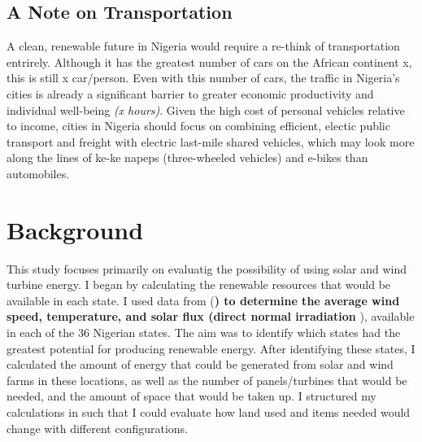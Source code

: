 \documentclass{scrartcl}
\begin{document}
\hypertarget{a-note-on-transportation}{%
\subsection{A Note on Transportation}\label{a-note-on-transportation}}

A clean, renewable future in Nigeria would require a re-think of
transportation entrirely. Although it has the greatest number of cars on
the African continent x, this is still x car/person. Even with this
number of cars, the traffic in Nigeria's cities is already a significant
barrier to greater economic productivity and individual well-being
\emph{(x hours)}. Given the high cost of personal vehicles relative to
income, cities in Nigeria should focus on combining efficient, electic
public transport and freight with electric last-mile shared vehicles,
which may look more along the lines of ke-ke napeps (three-wheeled
vehicles) and e-bikes than automobiles.

\hypertarget{background}{%
\section{Background}\label{background}}

This study focuses primarily on evaluatig the possibility of using solar
and wind turbine energy. I began by calculating the renewable resources
that would be available in each state. I used data from (\textbf{) to
determine the average wind speed, temperature, and solar flux (direct
normal irradiation }), available in each of the 36 Nigerian states. The
aim was to identify which states had the greatest potential for
producing renewable energy. After identifying these states, I calculated
the amount of energy that could be generated from solar and wind farms
in these locations, as well as the number of panels/turbines that would
be needed, and the amount of space that would be taken up. I structured
my calculations in such that I could evaluate how land used and items
needed would change with different configurations.

\begin{Shaded}
\begin{Highlighting}[]


\end{Highlighting}
\end{Shaded}
\end{document}
